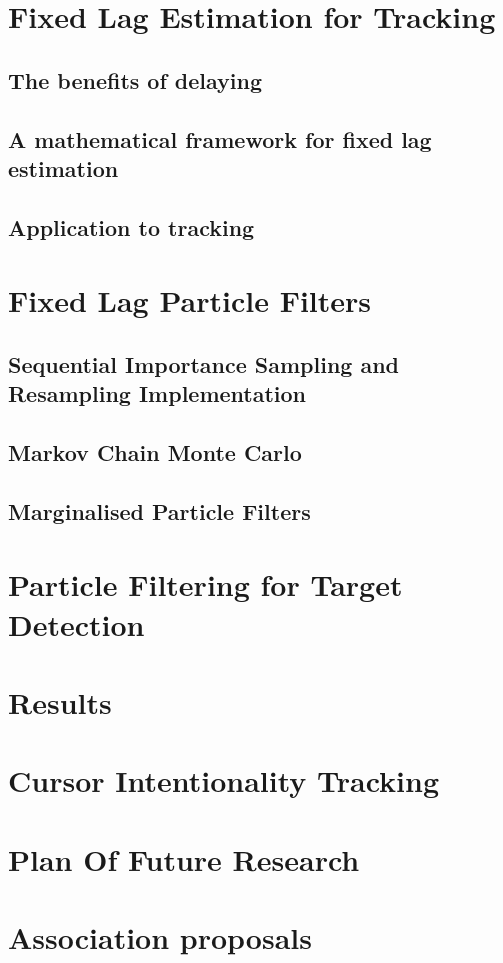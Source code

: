 \documentclass{RJWThesis}
\begin{document}
\chapter{Fixed Lag Estimation for Tracking}\label{FixedLag}
\section{The benefits of delaying}

\section{A mathematical framework for fixed lag estimation}
\label{sec:FixedLag2}
\section{Application to tracking}\label{FixedLag_App}


\chapter{Fixed Lag Particle Filters}
\section{Sequential Importance Sampling and Resampling Implementation}

\section{Markov Chain Monte Carlo}

\section{Marginalised Particle Filters}


\chapter{Particle Filtering for Target Detection}


\chapter{Results}



\chapter{Cursor Intentionality Tracking}


\chapter{Plan Of Future Research}


\cleardoublepage

\appendix
\chapter{Association proposals}



\end{document}
